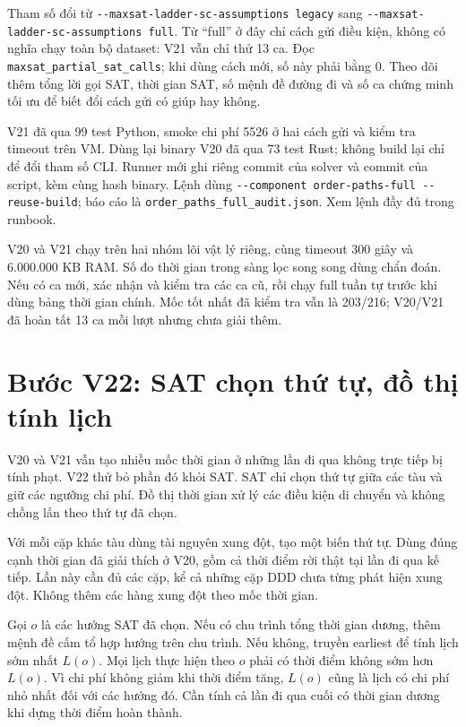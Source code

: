 \documentclass[11pt,a4paper]{article}
\newcommand{\file}[1]{\nolinkurl{#1}}
\begin{document}
Tham số đổi từ \file{--maxsat-ladder-sc-assumptions legacy} sang
\file{--maxsat-ladder-sc-assumptions full}. Từ ``full'' ở đây chỉ cách gửi
điều kiện, không có nghĩa chạy toàn bộ dataset: V21 vẫn chỉ thử 13 ca.
Đọc \file{maxsat_partial_sat_calls}; khi dùng cách mới, số này phải bằng 0.
Theo dõi thêm tổng lời gọi SAT, thời gian SAT, số mệnh đề đường đi và số ca
chứng minh tối ưu để biết đổi cách gửi có giúp hay không.

V21 đã qua 99 test Python, smoke chi phí 5526 ở hai cách gửi và kiểm tra
timeout trên VM. Dùng lại binary V20 đã qua 73 test Rust; không build lại
chỉ để đổi tham số CLI. Runner mới ghi riêng commit của solver và commit
của script, kèm cùng hash binary. Lệnh dùng
\file{--component order-paths-full --reuse-build}; báo cáo là
\file{order_paths_full_audit.json}. Xem lệnh đầy đủ trong runbook.

V20 và V21 chạy trên hai nhóm lõi vật lý riêng, cùng timeout 300 giây và
6.000.000 KB RAM. Số đo thời gian trong sàng lọc song song dùng chẩn đoán.
Nếu có ca mới, xác nhận và kiểm tra các ca cũ, rồi chạy full tuần tự trước
khi dùng bảng thời gian chính. Mốc tốt nhất đã kiểm tra vẫn là 203/216;
V20/V21 đã hoàn tất 13 ca mỗi lượt nhưng chưa giải thêm.

\section{Bước V22: SAT chọn thứ tự, đồ thị tính lịch}

V20 và V21 vẫn tạo nhiều mốc thời gian ở những lần đi qua không trực tiếp
bị tính phạt. V22 thử bỏ phần đó khỏi SAT. SAT chỉ chọn thứ tự giữa các
tàu và giữ các ngưỡng chi phí. Đồ thị thời gian xử lý các điều kiện di
chuyển và không chồng lấn theo thứ tự đã chọn.

Với mỗi cặp khác tàu dùng tài nguyên xung đột, tạo một biến thứ tự. Dùng
đúng cạnh thời gian đã giải thích ở V20, gồm cả thời điểm rời thật tại lần
đi qua kế tiếp. Lần này cần đủ các cặp, kể cả những cặp DDD chưa từng phát
hiện xung đột. Không thêm các hàng xung đột theo mốc thời gian.

Gọi $o$ là các hướng SAT đã chọn. Nếu có chu trình tổng thời gian dương,
thêm mệnh đề cấm tổ hợp hướng trên chu trình. Nếu không, truyền earliest
để tính lịch sớm nhất $L(o)$. Mọi lịch thực hiện theo $o$ phải có thời
điểm không sớm hơn $L(o)$. Vì chi phí không giảm khi thời điểm tăng,
$L(o)$ cũng là lịch có chi phí nhỏ nhất đối với các hướng đó. Cần tính
cả lần đi qua cuối có thời gian dương khi dựng thời điểm hoàn thành.
\end{document}
